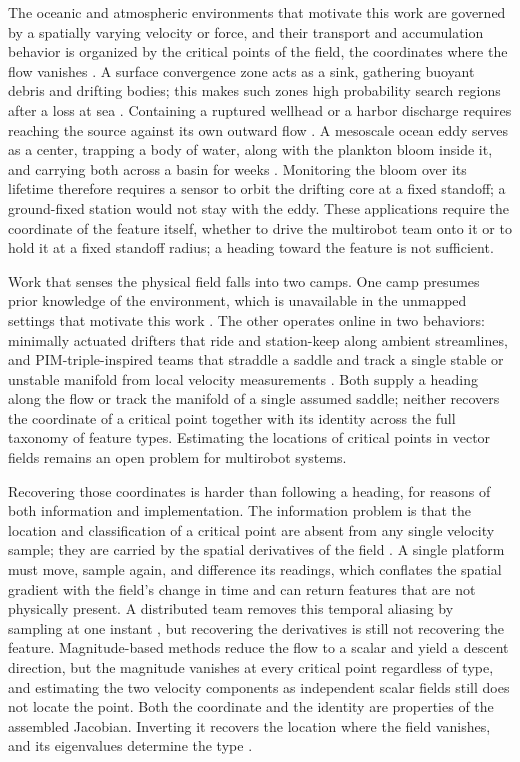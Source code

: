 \documentclass[lettersize,journal]{IEEEtran}
\begin{document}
The oceanic and atmospheric environments that motivate this work are governed by a spatially varying velocity or force, and their transport and accumulation behavior is organized by the critical points of the field, the coordinates where the flow vanishes \cite{32,36}. A surface convergence zone acts as a sink, gathering buoyant debris and drifting bodies; this makes such zones high probability search regions after a loss at sea \cite{37,38}. Containing a ruptured wellhead or a harbor discharge requires reaching the source against its own outward flow \cite{40,41}. A mesoscale ocean eddy serves as a center, trapping a body of water, along with the plankton bloom inside it, and carrying both across a basin for weeks \cite{43,44,45}. Monitoring the bloom over its lifetime therefore requires a sensor to orbit the drifting core at a fixed standoff; a ground-fixed station would not stay with the eddy. These applications require the coordinate of the feature itself, whether to drive the multirobot team onto it or to hold it at a fixed standoff radius; a heading toward the feature is not sufficient.

Work that senses the physical field falls into two camps. One camp presumes prior knowledge of the environment, which is unavailable in the unmapped settings that motivate this work \cite{30,31}. The other operates online in two behaviors: minimally actuated drifters that ride and station-keep along ambient streamlines, and PIM-triple-inspired teams that straddle a saddle and track a single stable or unstable manifold from local velocity measurements \cite{23,32,33}. Both supply a heading along the flow or track the manifold of a single assumed saddle; neither recovers the coordinate of a critical point together with its identity across the full taxonomy of feature types. Estimating the locations of critical points in vector fields remains an open problem for multirobot systems.

Recovering those coordinates is harder than following a heading, for reasons of both information and implementation. The information problem is that the location and classification of a critical point are absent from any single velocity sample; they are carried by the spatial derivatives of the field \cite{46}. A single platform must move, sample again, and difference its readings, which conflates the spatial gradient with the field's change in time and can return features that are not physically present. A distributed team removes this temporal aliasing by sampling at one instant \cite{22,23,47}, but recovering the derivatives is still not recovering the feature. Magnitude-based methods \cite{48} reduce the flow to a scalar and yield a descent direction, but the magnitude vanishes at every critical point regardless of type, and estimating the two velocity components as independent scalar fields still does not locate the point. Both the coordinate and the identity are properties of the assembled Jacobian. Inverting it recovers the location where the field vanishes, and its eigenvalues determine the type \cite{36}.
\end{document}
